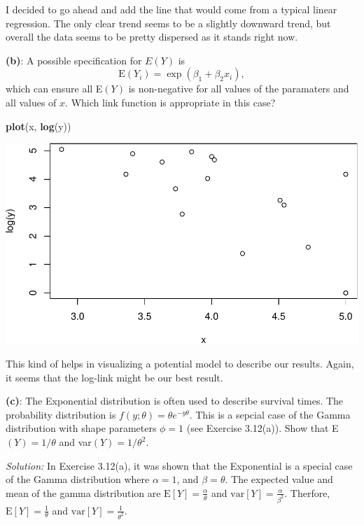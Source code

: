 \documentclass[]{article}
\newenvironment{Shaded}{\begin{snugshade}}{\end{snugshade}}
\newcommand{\KeywordTok}[1]{\textcolor[rgb]{0.13,0.29,0.53}{\textbf{{#1}}}}
\newcommand{\NormalTok}[1]{{#1}}
\begin{document}
I decided to go ahead and add the line that would come from a typical
linear regression. The only clear trend seems to be a slightly downward
trend, but overall the data seems to be pretty dispersed as it stands
right now.

\textbf{(b)}: A possible specification for \(E(Y)\) is \[
\text{E}(Y_i) = \exp(\beta_1 + \beta_2x_i),
\] which can ensure all E\((Y)\) is non-negative for all values of the
paramaters and all values of \(x\). Which link function is appropriate
in this case?

\begin{Shaded}
\begin{Highlighting}[]
\KeywordTok{plot}\NormalTok{(x, }\KeywordTok{log}\NormalTok{(y))}
\end{Highlighting}
\end{Shaded}

\includegraphics{ExercisesWithSolutions_files/figure-latex/unnamed-chunk-6-1.pdf}

This kind of helps in visualizing a potential model to describe our
results. Again, it seems that the log-link might be our best result.

\textbf{(c)}: The Exponential distribution is often used to describe
survival times. The probability distribution is
\(f(y; \theta) = \theta e^{-y\theta}\). This is a sepcial case of the
Gamma distribution with shape parameters \(\phi = 1\) (see Exercise
3.12(a)). Show that E\((Y) = 1/\theta\) and var\((Y) = 1/\theta^2\).

\emph{Solution: } In Exercise 3.12(a), it was shown that the Exponential
is a special case of the Gamma distribution where \(\alpha = 1\), and
\(\beta = \theta\). The expected value and mean of the gamma
distribution are \(\text{E}[Y] = \frac{\alpha}{\theta}\) and
\(\text{var}[Y] = \frac{\alpha}{\beta^2}\). Therfore,
\(\text{E}[Y] = \frac{1}{\theta}\) and
\(\text{var}[Y] = \frac{1}{\theta^2}\).
\end{document}
